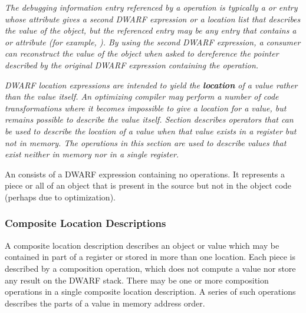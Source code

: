 \begin{enumerate}[1. ]
\textit{The debugging information entry referenced by a 
\DWOPimplicitpointerNAME{} operation is typically a
\DWTAGvariable{} or \DWTAGformalparameter{} entry whose
\DWATlocation{} attribute gives a second DWARF expression or a
location list that describes the value of the object, but the
referenced entry may be any entry that contains a \DWATlocation{}
or \DWATconstvalue{} attribute (for example, \DWTAGdwarfprocedure).
By using the second DWARF expression, a consumer can
reconstruct the value of the object when asked to dereference
the pointer described by the original DWARF expression
containing the \DWOPimplicitpointer{} operation.}

\end{enumerate}

\textit{DWARF location expressions are intended to yield the \textbf{location}
of a value rather than the value itself. An optimizing compiler
may perform a number of code transformations where it becomes
impossible to give a location for a value, but remains possible
to describe the value itself. 
Section 
describes operators that can be used to
describe the location of a value when that value exists in a
register but not in memory. The operations in this section are
used to describe values that exist neither in memory nor in a
single register.}

An 
consists of a DWARF expression
containing no operations. It represents a piece or all of an
object that is present in the source but not in the object code
(perhaps due to optimization).

\subsubsection{Composite Location Descriptions}
A composite location description describes an object or
value which may be contained in part of a register or stored
in more than one location. Each piece is described by a
composition operation, which does not compute a value nor
store any result on the DWARF stack. There may be one or
more composition operations in a single composite location
description. A series of such operations describes the parts
of a value in memory address order.


